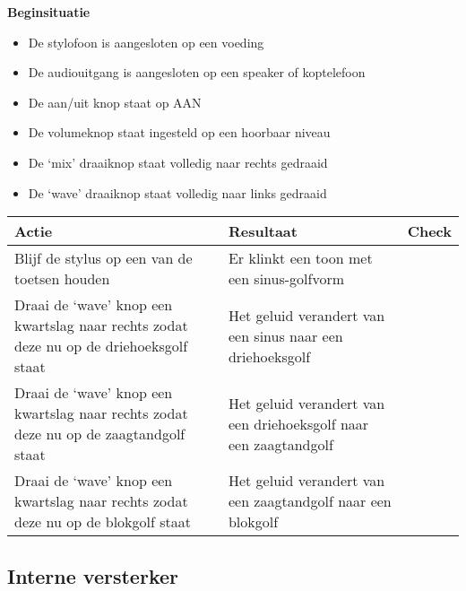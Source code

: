 \documentclass[12pt, a4paper, dutch]{article}
\newcommand{\cb}{\Square}
\newcommand{\stroom}{De stylofoon is aangesloten op een voeding}
\newcommand{\audio}{De audiouitgang is aangesloten op een speaker of koptelefoon}
\newcommand{\aan}{De aan/uit knop staat op AAN}
\newcommand{\vol}{De volumeknop staat ingesteld op een hoorbaar niveau}
\begin{document}
\begin{minipage}{\textwidth}
\textbf{Beginsituatie}
\begin{itemize}
	\item \stroom
	\item \audio
	\item \aan
	\item \vol
	\item De `mix' draaiknop staat volledig naar rechts gedraaid
	\item De `wave' draaiknop staat volledig naar links gedraaid
\end{itemize}

\medskip

\begin{tabularx}{\textwidth}{p{}p{}>{\raggedleft\arraybackslash}X}
\toprule
\textbf{Actie} & \textbf{Resultaat} & \textbf{Check}\\
\midrule
Blijf de stylus op een van de toetsen houden &
Er klinkt een toon met een sinus-golfvorm &
\cb\\

Draai de `wave' knop een kwartslag naar rechts zodat deze nu op de driehoeksgolf
staat &
Het geluid verandert van een sinus naar een driehoeksgolf &
\cb\\

Draai de `wave' knop een kwartslag naar rechts zodat deze nu op de zaagtandgolf
staat &
Het geluid verandert van een driehoeksgolf naar een zaagtandgolf &
\cb\\

Draai de `wave' knop een kwartslag naar rechts zodat deze nu op de blokgolf staat &
Het geluid verandert van een zaagtandgolf naar een blokgolf &
\cb\\
\bottomrule
\end{tabularx}
\end{minipage}

\subsection{Interne versterker}
\end{document}
